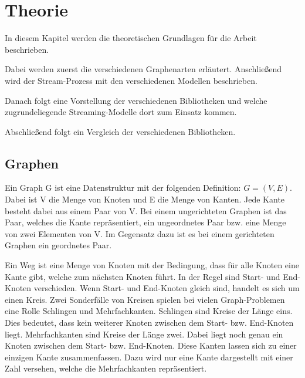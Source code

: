 \chapter{Theorie}
In diesem Kapitel werden die theoretischen Grundlagen für die Arbeit beschrieben.

Dabei werden zuerst die verschiedenen Graphenarten erläutert. Anschließend wird
der Stream-Prozess mit den verschiedenen Modellen beschrieben.

Danach folgt eine Vorstellung der verschiedenen Bibliotheken und welche
zugrundeliegende Streaming-Modelle dort zum Einsatz kommen.

Abschließend folgt ein Vergleich der verschiedenen Bibliotheken.

\section{Graphen}
Ein Graph G ist eine Datenstruktur mit der folgenden Definition: $G = (V,E)$.
Dabei ist V die Menge von Knoten und E die Menge von Kanten. Jede Kante besteht
dabei aus einem Paar von V. Bei einem ungerichteten Graphen ist das Paar, welches
die Kante repräsentiert, ein ungeordnetes Paar bzw. eine Menge von zwei
Elementen von V. Im Gegensatz dazu ist es bei einem gerichteten Graphen ein
geordnetes Paar.


Ein Weg ist eine Menge von Knoten mit der Bedingung, dass für alle Knoten eine
Kante gibt, welche zum nächsten Knoten führt. In der Regel sind Start- und
End-Knoten verschieden. Wenn Start- und End-Knoten gleich sind, handelt es sich
um einen Kreis. Zwei Sonderfälle von Kreisen spielen bei vielen Graph-Problemen
eine Rolle Schlingen und Mehrfachkanten. Schlingen sind Kreise der Länge eins.
Dies bedeutet, dass kein weiterer Knoten zwischen dem Start- bzw. End-Knoten
liegt. Mehrfachkanten sind Kreise der Länge zwei. Dabei liegt noch genau ein
Knoten zwischen dem Start- bzw. End-Knoten. Diese Kanten lassen sich zu einer
einzigen Kante zusammenfassen. Dazu wird nur eine Kante dargestellt mit einer
Zahl versehen, welche die Mehrfachkanten repräsentiert.

